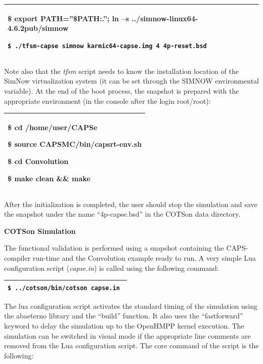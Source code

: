 \documentclass[a4paper]{article}
\begin{document}
\begin{flushleft}
\tablehead{}
\begin{supertabular}{|m{6.15046in}|}
\hline
{\ttfamily \$ export
PATH={\textquotedblright}\$PATH:.{\textquotedblright}; ln --s
../simnow-linux64-4.6.2pub/simnow}

 \texttt{\$ }\texttt{./tfsm-capse simnow
karmic64-capse.img 4 4p-reset.bsd}\\\hline
\end{supertabular}
\end{flushleft}
{
Note also that the \textit{tfsm} script needs to know the installation
location of the SimNow virtualization system (it can be set through the
SIMNOW environmental variable). At the end of the boot process, the
snapshot is prepared with the appropriate environment (in the console
after the login root/root):}

\begin{flushleft}
\tablehead{}
\begin{supertabular}{|m{6.15046in}|}
\hline
{\ttfamily \$ cd /home/user/CAPSe}

{\ttfamily \$ source CAPSMC/bin/capsrt-env.sh}

{\ttfamily \$ cd Convolution}

\ttfamily \$ make clean \&\& make \\\hline
\end{supertabular}
\end{flushleft}
{
After the initialization is completed, the user should stop the
simulation and save the snapshot under the name
{\textquotedblleft}4p-capse.bsd{\textquotedblright} in the COTSon data
directory.}

{\bfseries
COTSon Simulation}

{
The functional validation is performed using a snapshot containing the
CAPS-compiler run-time and the Convolution example ready to run. A very
simple Lua configuration script (\textit{capse.in}) is called using the
following command:}

\begin{flushleft}
\tablehead{}
\begin{supertabular}{|m{6.15046in}|}
\hline
{} \texttt{\$ ../cotson/bin/cotson
capse.in}\foreignlanguage{english}{\texttt{ }}\\\hline
\end{supertabular}
\end{flushleft}
{
The lua configuration script activates the standard timing of the
simulation using the abaeterno library and the
{\textquotedblleft}build{\textquotedblright} function. It also uses the
{\textquotedblleft}fastforward{\textquotedblright} keyword to delay the
simulation up to the OpenHMPP kernel execution. The simulation can be
switched in visual mode if the appropriate line comments are removed
from the Lua configuration script. The core command of the script is
the following:}
\end{document}
